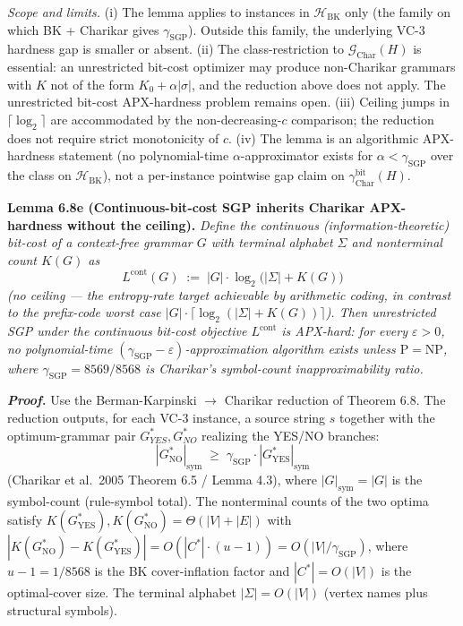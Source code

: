 \documentclass[
]{article}
\begin{document}
\emph{Scope and limits.} (i) The lemma applies to instances in
$\mathcal{H}_{\mathrm{BK}}$ only (the family on which BK + Charikar
gives $\gamma_{\mathrm{SGP}}$). Outside this family, the underlying
VC-3 hardness gap is smaller or absent. (ii) The class-restriction
to $\mathcal{G}_{\mathrm{Char}}(H)$ is essential: an unrestricted
bit-cost optimizer may produce non-Charikar grammars with $K$ not of
the form $K_0 + \alpha|\sigma|$, and the reduction above does not
apply. The unrestricted bit-cost APX-hardness problem remains open.
(iii) Ceiling jumps in $\lceil \log_2 \rceil$ are accommodated by the
non-decreasing-$c$ comparison; the reduction does not require strict
monotonicity of $c$. (iv) The lemma is an algorithmic APX-hardness
statement (no polynomial-time $\alpha$-approximator exists for $\alpha
< \gamma_{\mathrm{SGP}}$ over the class on $\mathcal{H}_{\mathrm{BK}}$),
not a per-instance pointwise gap claim on $\gamma^{\mathrm{bit}}_{\mathrm{Char}}(H)$.

\textbf{Lemma 6.8e (Continuous-bit-cost SGP inherits Charikar APX-hardness without the ceiling).}
\emph{Define the continuous (information-theoretic) bit-cost of a
context-free grammar $G$ with terminal alphabet $\Sigma$ and
nonterminal count $K(G)$ as}
\[
L^{\mathrm{cont}}(G) \;:=\; |G| \cdot \log_2\bigl(|\Sigma| + K(G)\bigr)
\]
\emph{(no ceiling --- the entropy-rate target achievable by arithmetic
coding, in contrast to the prefix-code worst case
$|G| \cdot \lceil \log_2(|\Sigma| + K(G)) \rceil$). Then unrestricted
SGP under the continuous bit-cost objective $L^{\mathrm{cont}}$ is
APX-hard: for every $\varepsilon > 0$, no polynomial-time
$(\gamma_{\mathrm{SGP}} - \varepsilon)$-approximation algorithm exists
unless $\mathrm{P} = \mathrm{NP}$, where $\gamma_{\mathrm{SGP}} = 8569/8568$
is Charikar's symbol-count inapproximability ratio.}

\emph{\textbf{Proof.}} Use the Berman-Karpinski $\to$ Charikar reduction
of Theorem 6.8. The reduction outputs, for each VC-3 instance, a source
string $s$ together with the optimum-grammar pair $G^*_{YES}, G^*_{NO}$
realizing the YES/NO branches:
\[
|G^*_{\mathrm{NO}}|_{\mathrm{sym}} \;\geq\; \gamma_{\mathrm{SGP}} \cdot |G^*_{\mathrm{YES}}|_{\mathrm{sym}}
\]
(Charikar et al.\ 2005 Theorem 6.5 / Lemma 4.3), where
$|G|_{\mathrm{sym}} = |G|$ is the symbol-count (rule-symbol total).
The nonterminal counts of the two optima satisfy
$K(G^*_{\mathrm{YES}}), K(G^*_{\mathrm{NO}}) = \Theta(|V| + |E|)$ with
$|K(G^*_{\mathrm{NO}}) - K(G^*_{\mathrm{YES}})| =
O(|C^* | \cdot (u-1)) = O(|V|/\gamma_{\mathrm{SGP}})$, where $u-1 =
1/8568$ is the BK cover-inflation factor and $|C^*| = O(|V|)$ is the
optimal-cover size. The terminal alphabet $|\Sigma| = O(|V|)$ (vertex
names plus structural symbols).
\end{document}
